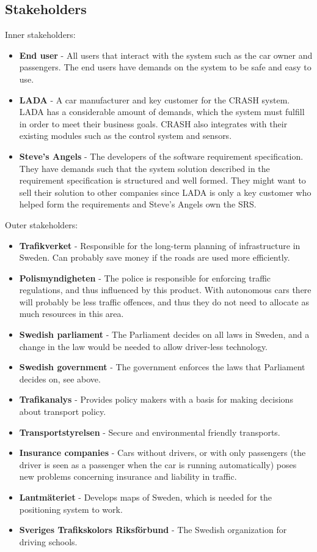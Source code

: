 \documentclass{article}
\begin{document}
\subsection{Stakeholders}
\noindent Inner stakeholders:
\begin{itemize}
\item \textbf{End user} - All users that interact with the system such as the car owner and passengers. The end users have demands on the system to be safe and easy to use.
\item \textbf{LADA} - A car manufacturer and key customer for the CRASH system. LADA has a considerable amount of demands, which the system must fulfill in order to meet their business goals. CRASH also integrates with their existing modules such as the control system and sensors.
\item \textbf{Steve's Angels} - The developers of the software requirement specification. They have demands such that the system solution described in the requirement specification is structured and well formed. They might want to sell their solution to other companies since LADA is only a key customer who helped form the requirements and Steve's Angels own the SRS.
\end{itemize}

\noindent Outer stakeholders:
\begin{itemize}
\item \textbf{Trafikverket} - Responsible for the long-term planning of infrastructure in Sweden. Can probably save money if the roads are used more efficiently. 
\item \textbf{Polismyndigheten} - The police is responsible for enforcing traffic regulations, and thus influenced by this product. With autonomous cars there will probably be less traffic offences, and thus they do not need to allocate as much resources in this area. 
\item \textbf{Swedish parliament} - The Parliament decides on all laws in Sweden, and a change in the law would be needed to allow driver-less technology.
\item \textbf{Swedish government} - The government enforces the laws that Parliament decides on, see above.
\item \textbf{Trafikanalys} - Provides policy makers with a basis for making decisions about transport policy.
\item \textbf{Transportstyrelsen} - Secure and environmental friendly transports.
\item \textbf{Insurance companies} - Cars without drivers, or with only passengers (the driver is seen as a passenger when the car is running automatically) poses new problems concerning insurance and liability in traffic.
\item \textbf{Lantmäteriet} - Develops maps of Sweden, which is needed for the positioning system to work.
\item \textbf{Sveriges Trafikskolors Riksförbund} - The Swedish organization for driving schools.
\end{itemize}
\end{document}
